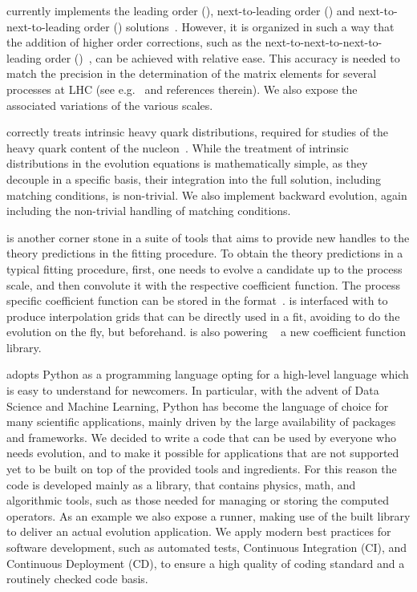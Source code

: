 \eko{} currently implements the leading order (\lo{}),
next-to-leading order (\nlo{}) and next-to-next-to-leading order (\nnlo{})
solutions~\cite{Vogt:2004mw,Moch:2004pa,Blumlein:2021enk}.
However, it is organized in such a way that the addition of higher order corrections,
such as the next-to-next-to-next-to-leading order (\nnnlo{})~\cite{Moch:2021qrk},
can be achieved with relative ease.
This accuracy is needed to match the precision in the determination of the
matrix elements for several processes at LHC (see e.g.\ \cite{Duhr:2021vwj} and
references therein).
We also expose the associated variations of the various scales.

\eko{} correctly treats intrinsic heavy quark distributions,
required for studies of the heavy quark content of the nucleon~\cite{Ball:2022qks}.
While the treatment of intrinsic distributions in the evolution equations is
mathematically simple, as they decouple in a specific basis, their integration
into the full solution, including matching conditions, is non-trivial.
We also implement backward evolution, again including the non-trivial
handling of matching conditions.

\eko{} is another corner stone in a suite of tools that aims to
provide new handles to the theory predictions in the \pdf{} fitting
procedure. To obtain the theory predictions in a typical fitting procedure,
first, one needs to evolve a candidate \pdf{} up to the process scale,
and then convolute it with the respective coefficient function.
The process specific coefficient function can be stored in the
\pineappl{} format~\cite{Carrazza_2020,christopher_schwan_2022_5846421}.
\eko{} is interfaced with \pineappl{} to produce
interpolation grids that can be directly used in a \pdf{} fit,
avoiding to do the evolution on the fly, but beforehand.
\eko{} is also powering \yadism{}~\cite{yadism} a new \dis{}
coefficient function library.

\eko{} adopts Python as a programming language opting for a high-level language
which is easy to understand for newcomers.
In particular, with the advent of Data Science and Machine Learning, Python has
become the language of choice for many scientific applications, mainly driven
by the large availability of packages and frameworks.
We decided to write a code that can be used by everyone who needs \qcd{}
evolution, and to make it possible for applications that are not supported yet
to be built on top of the provided tools and ingredients.
For this reason the code is developed mainly as a library, that contains
physics, math, and algorithmic tools, such as those needed for managing or
storing the computed operators. As an example we also expose a runner, making
use of the built library to deliver an actual evolution application. 
We apply modern best practices for software development, such as automated
tests, Continuous Integration (CI), and Continuous Deployment (CD), to ensure a
high quality of coding standard and a routinely checked code basis.

